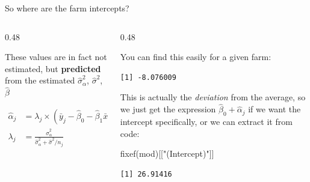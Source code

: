 \documentclass[
  ignorenonframetext,
  aspectratio=169,
]{beamer}
\newenvironment{Shaded}{\begin{snugshade}}{\end{snugshade}}
\newcommand{\DecValTok}[1]{\textcolor[rgb]{0.68,0.00,0.00}{#1}}
\newcommand{\FunctionTok}[1]{\textcolor[rgb]{0.28,0.35,0.67}{#1}}
\newcommand{\NormalTok}[1]{\textcolor[rgb]{0.00,0.23,0.31}{#1}}
\newcommand{\SpecialCharTok}[1]{\textcolor[rgb]{0.37,0.37,0.37}{#1}}
\newcommand{\StringTok}[1]{\textcolor[rgb]{0.13,0.47,0.30}{#1}}
\begin{document}
\begin{frame}[fragile]{So where are the farm intercepts?}
\label{so-where-are-the-farm-intercepts}
\begin{columns}[T]
\begin{column}{0.48\textwidth}
\vspace{2em}

These values are in fact not estimated, but \textbf{predicted} from the
estimated \(\hat\sigma^2_\alpha\), \(\hat\sigma^2\), \(\hat\beta\)

\begin{equation}
\begin{aligned}
\hat\alpha_j &= \lambda_j \times \left(\bar y_j - \hat\beta_0 - \hat\beta_1 \bar x_j\right) \\
\lambda_j &= \frac{\hat\sigma^2_\alpha}{\hat\sigma^2_\alpha + \hat\sigma^2 / n_j}
\end{aligned}
\end{equation}
\end{column}

\begin{column}{0.48\textwidth}
\pause

\small

You can find this easily for a given farm:

\begin{Shaded}
\end{Shaded}

\begin{verbatim}
[1] -8.076009
\end{verbatim}

\pause

This is actually the \emph{deviation} from the average, so we just get
the expression \(\hat\beta_0 + \hat\alpha_j\) if we want the intercept
specifically, or we can extract it from code:

\begin{Shaded}
\begin{Highlighting}[]
\FunctionTok{fixef}\NormalTok{(mod)[[}\StringTok{"(Intercept)"}\NormalTok{]] }
\end{Highlighting}
\end{Shaded}

\begin{verbatim}
[1] 26.91416
\end{verbatim}


\end{column}
\end{columns}
\end{frame}
\end{document}
